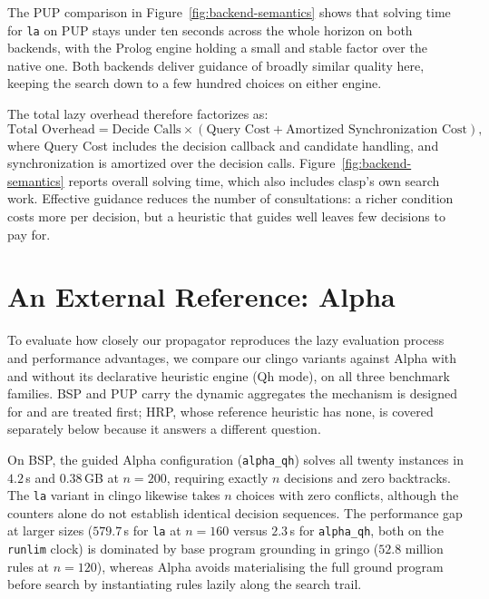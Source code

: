 The PUP comparison in Figure~\ref{fig:backend-semantics} shows that solving time for \texttt{la} on PUP stays under ten seconds across the whole horizon on both backends, with the Prolog engine holding a small and stable factor over the native one. Both backends deliver guidance of broadly similar quality here, keeping the search down to a few hundred choices on either engine.



The total lazy overhead therefore factorizes as:
\[
\text{Total Overhead} = \text{Decide Calls} \times (\text{Query Cost} + \text{Amortized Synchronization Cost}),
\]
where Query Cost includes the decision callback and candidate handling, and synchronization is amortized over the decision calls. Figure~\ref{fig:backend-semantics} reports overall solving time, which also includes clasp's own search work.
Effective guidance reduces the number of consultations: a richer condition costs more per decision, but a heuristic that guides well leaves few decisions to pay for.



\FloatBarrier
\section{An External Reference: Alpha}
\label{sec:alpha}

To evaluate how closely our propagator reproduces the lazy evaluation process and performance advantages, we compare our clingo variants against Alpha with and without its declarative heuristic engine (Qh mode), on all three benchmark families. BSP and PUP carry the dynamic aggregates the mechanism is designed for and are treated first; HRP, whose reference heuristic has none, is covered separately below because it answers a different question.

On BSP, the guided Alpha configuration (\texttt{alpha\_qh}) solves all twenty instances in $4.2$\,s and $0.38$\,GB at $n=200$, requiring exactly $n$ decisions and zero backtracks. The \texttt{la} variant in clingo likewise takes $n$ choices with zero conflicts, although the counters alone do not establish identical decision sequences. The performance gap at larger sizes ($579.7$\,s for \texttt{la} at $n=160$ versus $2.3$\,s for \texttt{alpha\_qh}, both on the \texttt{runlim} clock) is dominated by base program grounding in gringo ($52.8$ million rules at $n=120$), whereas Alpha avoids materialising the full ground program before search by instantiating rules lazily along the search trail.

